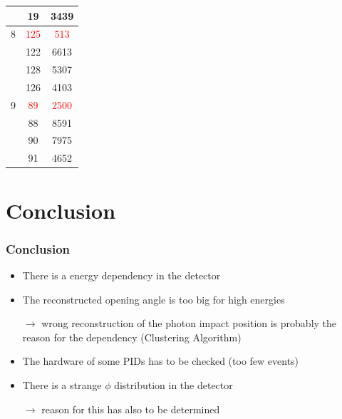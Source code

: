 \documentclass[slidestop,compress,mathserif]{beamer}
\begin{document}
\begin{frame}
\begin{table}[ht]
\begin{minipage}[b]{0.45\linewidth}
{\begin{tabular}{lcc}
					& 19& 3439 \\
					
					\hline
					
					8 & \textcolor{red}{125} &\textcolor{red}{513} \\
					
					
					& 122& 6613\\
					
					& 128 & 5307 \\
					
					& 126 & 4103 \\
					
					\hline
					
					9 & \textcolor{red}{89}& \textcolor{red}{2500}\\
					
					& 88& 8591\\
					
					&90&7975 \\
					
					&91&4652 \\
					
					
					
				\end{tabular}
		}	
		\end{minipage}
		
			
		\end{table}
	
\end{frame}



\section{Conclusion}
\begin{frame}
	\frametitle{Conclusion}
	\begin{itemize}
		\item There is a energy dependency in the detector
		\item The reconstructed opening angle is too big for high energies
		
		$\rightarrow$ wrong reconstruction of the photon impact position is probably the reason for the dependency (Clustering Algorithm) 
		\item The hardware of some PIDs has to be checked (too few events)
		\item There is a strange $\phi$ distribution in the detector
		
		$\rightarrow$ reason for this has also to be determined
	\end{itemize}
\end{frame}
\end{document}
